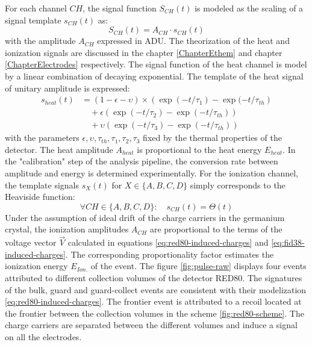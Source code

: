 For each channel $CH$, the signal function $S_{CH}(t)$ is modeled as the scaling of a signal template $s_{CH}(t)$ as:
\begin{equation}
S_{CH}(t) = A_{CH} \cdot s_{CH}(t)
\end{equation}
with the amplitude $A_{CH}$ expressed in ADU.
The theorization of the heat and ionization signals are discussed in the chapter \ref{ChapterEthem} and chapter \ref{ChapterElectrodes} respectively. The signal function of the heat channel is model by a linear combination of decaying exponential. The template of the heat signal of unitary amplitude is expressed:
\begin{equation}
\label{eq:heat-channel-signal-function}
\begin{split}
s_{heat}(t)
&=
(1 - \epsilon - \upsilon) \times \left( \exp(-t/\tau_{1}) - \exp(-t/\tau_{th} \right)
\\
& \quad +
\epsilon \left( \exp(-t/\tau_{2}) - \exp(-t/\tau_{th}) \right)
\\
& \quad +
\upsilon \left( \exp(-t/\tau_{3}) - \exp(-t/\tau_{th}) \right)
\end{split}
\end{equation}
with the parameters $\epsilon, \upsilon, \tau_{th}, \tau_1, \tau_2, \tau_3$ fixed by the thermal properties of the detector. The heat amplitude $A_{heat}$ is proportional to the heat energy $E_{heat}$. In the "calibration" step of the analysis pipeline, the conversion rate between amplitude and energy is determined experimentally. 
For the ionization channel, the template signals $s_{X}(t)$ for $X \in \{A,B,C,D\}$ simply corresponds to the Heaviside function:
\begin{equation}
\label{eq:ionization-channel-signl-function}
\forall CH \in \{A,B,C,D\}: \quad s_{CH}(t) = \Theta(t)
\end{equation}
Under the assumption of ideal drift of the charge carriers in the germanium crystal, the ionization amplitudes $A_{CH}$ are proportional to the terms of the voltage vector $\vec{V}$ calculated in equations \ref{eq:red80-induced-charges} and \ref{eq:fid38-induced-charges}. The corresponding proportionality factor estimates the ionization energy $E_{Ion.}$ of the event. The figure \ref{fig:pulse-raw} displays four events attributed to different collection volumes of the detector RED80. The signatures of the bulk, guard and guard-collect events are consistent with their modelization \ref{eq:red80-induced-charges}. The frontier event is attributed to a recoil located at the frontier between the collection volumes in the scheme \ref{fig:red80-scheme}. The charge carriers are separated between the different volumes and induce a signal on all the electrodes.


